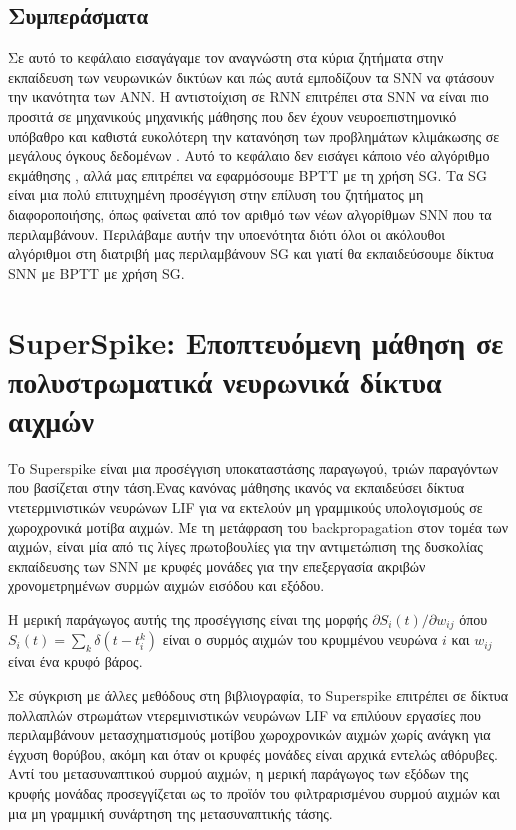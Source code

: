 \documentclass[12pt]{report}
\begin{document}
\subsection{Συμπεράσματα}
Σε αυτό το κεφάλαιο εισαγάγαμε τον αναγνώστη στα κύρια ζητήματα στην εκπαίδευση των νευρωνικών δικτύων και πώς αυτά εμποδίζουν τα \textlatin{SNN} να φτάσουν την ικανότητα των ANN. Η αντιστοίχιση σε \textlatin{RNN} επιτρέπει στα \textlatin{SNN} να είναι πιο προσιτά σε μηχανικούς μηχανικής μάθησης που δεν έχουν νευροεπιστημονικό υπόβαθρο και καθιστά ευκολότερη την κατανόηση των προβλημάτων κλιμάκωσης σε μεγάλους όγκους δεδομένων . Αυτό το κεφάλαιο δεν εισάγει κάποιο νέο αλγόριθμο εκμάθησης , αλλά μας επιτρέπει να εφαρμόσουμε \textlatin{BPTT} με τη χρήση \textlatin{SG}. Τα \textlatin{SG} είναι μια πολύ επιτυχημένη προσέγγιση στην επίλυση του ζητήματος μη διαφοροποιήσης, όπως φαίνεται από τον αριθμό των νέων αλγορίθμων \textlatin{SNN}  που τα περιλαμβάνουν. Περιλάβαμε αυτήν την υποενότητα διότι όλοι οι ακόλουθοι αλγόριθμοι στη διατριβή μας περιλαμβάνουν \textlatin{SG} και γιατί θα εκπαιδεύσουμε δίκτυα \textlatin{SNN} με \textlatin{BPTT} με χρήση \textlatin{SG}.

\section{\textlatin{SuperSpike}: Εποπτευόμενη μάθηση σε πολυστρωματικά νευρωνικά δίκτυα αιχμών}
Το \textlatin{Superspike} είναι μια προσέγγιση υποκαταστάσης παραγωγού,  τριών παραγόντων που βασίζεται στην τάση.Ενας κανόνας μάθησης ικανός να εκπαιδεύσει δίκτυα ντετερμινιστικών νευρώνων \textlatin{LIF} για να εκτελούν μη γραμμικούς υπολογισμούς σε χωροχρονικά μοτίβα αιχμών. Με τη μετάφραση του \textlatin{backpropagation} στον τομέα των αιχμών, είναι μία από τις λίγες πρωτοβουλίες για την αντιμετώπιση της δυσκολίας εκπαίδευσης των \textlatin{SNN }με κρυφές μονάδες για την επεξεργασία ακριβών χρονομετρημένων συρμών αιχμών εισόδου και εξόδου.

Η μερική παράγωγος αυτής της προσέγγισης είναι της μορφής $\partial S_{i}(t) / \partial w_{i j}$ όπου $S_{i}(t)=\sum_{k} \delta\left(t-t_{i}^{k}\right)$ είναι ο συρμός αιχμών του κρυμμένου νευρώνα $i$ και $w_{i j}$ είναι ένα κρυφό βάρος.

Σε σύγκριση με άλλες μεθόδους στη βιβλιογραφία, το \textlatin{Superspike} επιτρέπει σε δίκτυα πολλαπλών στρωμάτων ντερεμινιστικών νευρώνων \textlatin{LIF} να επιλύουν εργασίες που περιλαμβάνουν μετασχηματισμούς μοτίβου χωροχρονικών αιχμών χωρίς ανάγκη για έγχυση θορύβου, ακόμη και όταν οι κρυφές μονάδες είναι αρχικά εντελώς αθόρυβες. Αντί του μετασυναπτικού συρμού αιχμών, η μερική παράγωγος των εξόδων της κρυφής μονάδας προσεγγίζεται ως το προϊόν του φιλτραρισμένου συρμού αιχμών και μια μη γραμμική συνάρτηση της μετασυναπτικής τάσης.
\end{document}
